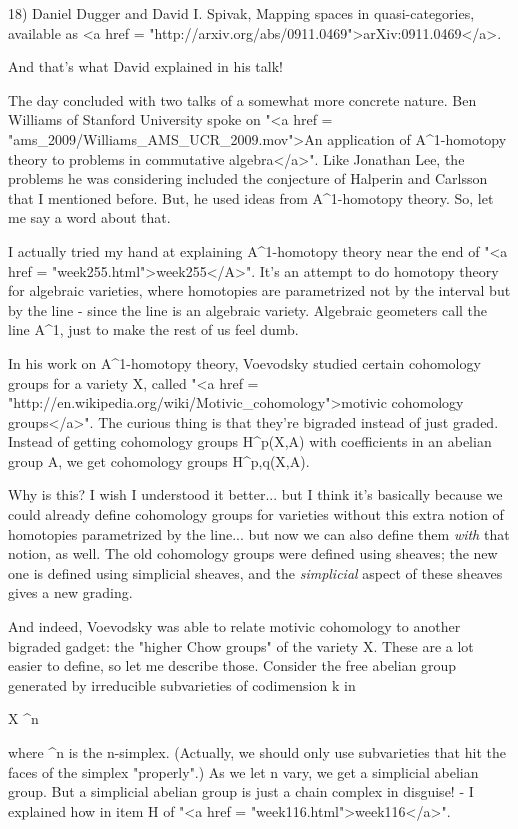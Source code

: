 18) Daniel Dugger and David I. Spivak, Mapping spaces in
quasi-categories, available as <a href = "http://arxiv.org/abs/0911.0469">arXiv:0911.0469</a>.

And that's what David explained in his talk!

The day concluded with two talks of a somewhat more concrete nature.
Ben Williams of Stanford University spoke on "<a href =
"ams_2009/Williams_AMS_UCR_2009.mov">An application of
A^{1}-homotopy theory to problems in commutative
algebra</a>".  Like Jonathan Lee, the problems he was considering
included the conjecture of Halperin and Carlsson that I mentioned
before.  But, he used ideas from A^{1}-homotopy theory.  So,
let me say a word about that.

I actually tried my hand at explaining A^{1}-homotopy theory
near the end of "<a href = "week255.html">week255</A>".
It's an attempt to do homotopy theory for algebraic varieties, where
homotopies are parametrized not by the interval but by the line -
since the line is an algebraic variety.  Algebraic geometers call
the line A^{1}, just to make the rest of us feel dumb.

In his work on A^{1}-homotopy theory, Voevodsky studied
certain cohomology groups for a variety X, called "<a href =
"http://en.wikipedia.org/wiki/Motivic_cohomology">motivic cohomology
groups</a>".  The curious thing is that they're bigraded instead
of just graded.  Instead of getting cohomology groups
H^{p}(X,A) with coefficients in an abelian group A, we get
cohomology groups H^{p,q}(X,A).

Why is this?  I wish I understood it better... but I think it's
basically because we could already define cohomology groups for
varieties without this extra notion of homotopies parametrized by
the line... but now we can also define them \emph{with} that notion, as
well.  The old cohomology groups were defined using sheaves; the 
new one is defined using simplicial sheaves, and the \emph{simplicial}
aspect of these sheaves gives a new grading.

And indeed, Voevodsky was able to relate motivic cohomology to another
bigraded gadget: the "higher Chow groups" of the variety X.
These are a lot easier to define, so let me describe those.  Consider
the free abelian group generated by irreducible subvarieties of
codimension k in 

X \times  \Delta ^{n}

where \Delta ^{n} is the n-simplex.  (Actually, we should
only use subvarieties that hit the faces of the simplex
"properly".)  As we let n vary, we get a simplicial abelian
group.  But a simplicial abelian group is just a chain complex in
disguise! - I explained how in item H of "<a href =
"week116.html">week116</a>".

